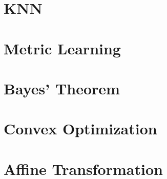 \section{KNN}


\section{Metric Learning}


\section{Bayes' Theorem}


\section{Convex Optimization}


\section{Affine Transformation}


